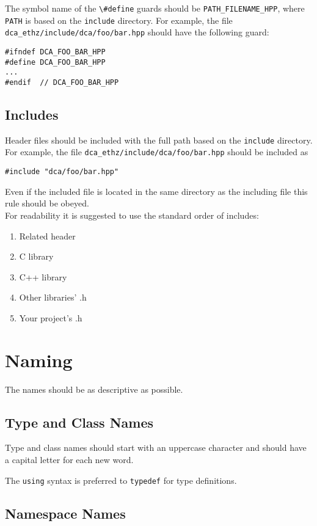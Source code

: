 \documentclass[a4paper]{article}
\newcommand{\inlinecode}[1]{\lstinline|#1|}
\begin{document}
The symbol name of the \inlinecode{\#define} guards should be \inlinecode{PATH_FILENAME_HPP}, where \inlinecode{PATH} is based on the \verb|include| directory. For example, the file\\ \verb|dca_ethz/include/dca/foo/bar.hpp| should have the following guard:

\begin{lstlisting}
#ifndef DCA_FOO_BAR_HPP
#define DCA_FOO_BAR_HPP
...
#endif  // DCA_FOO_BAR_HPP
\end{lstlisting}

\subsection{Includes}
Header files should be included with the full path based on the \verb|include| directory. For example, the file \verb|dca_ethz/include/dca/foo/bar.hpp| should be included as
\begin{lstlisting}
#include "dca/foo/bar.hpp"
\end{lstlisting}
Even if the included file is located in the same directory as the including file this rule should be obeyed. \\

For readability it is suggested to use the standard order of includes:
\begin{enumerate}
	\item Related header
	\item C library
	\item C++ library
	\item Other libraries' .h
	\item Your project's .h
\end{enumerate}
\section{Naming}

The names should be as descriptive as possible.

\subsection{Type and Class Names}

Type and class names should start with an uppercase character and should have a capital letter for each new word.

The \inlinecode{using} syntax is preferred to \inlinecode{typedef} for type definitions.

\subsection{Namespace Names}
\end{document}
